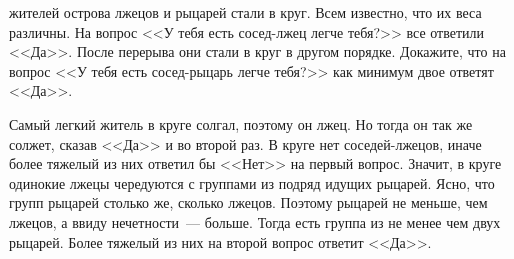  жителей острова лжецов и рыцарей стали в круг.
Всем известно, что их веса различны.
На вопрос <<У тебя есть сосед-лжец легче тебя?>> все ответили <<Да>>.
После перерыва они стали в круг в другом порядке.
Докажите, что на вопрос <<У тебя есть сосед-рыцарь легче тебя?>> как минимум
двое ответят <<Да>>.

\solution
Самый легкий житель в круге солгал, поэтому он лжец.
Но тогда он так же солжет, сказав <<Да>> и во второй раз.
В круге нет соседей-лжецов, иначе более тяжелый из них ответил бы <<Нет>> на
первый вопрос.
Значит, в круге одинокие лжецы чередуются с группами из подряд идущих рыцарей.
Ясно, что групп рыцарей столько же, сколько лжецов.
Поэтому рыцарей не меньше, чем лжецов, а ввиду нечетности~--- больше.
Тогда есть группа из не менее чем двух рыцарей.
Более тяжелый из них на второй вопрос ответит <<Да>>.

\endproblem
